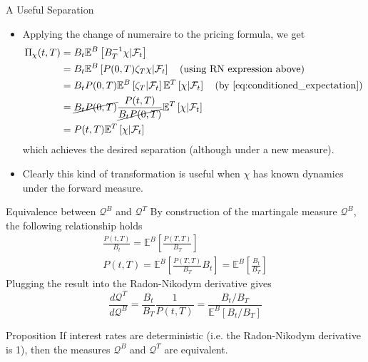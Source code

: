 \documentclass{beamer}
\begin{document}
\begin{frame}{A Useful Separation}
  \begin{itemize}
  \item<1-> Applying the change of numeraire to the pricing formula, we get
    \begin{equation*}
      \begin{aligned}
	\Pi_\chi(t,T) & = B_t\mathbb{E}^B\left[B^{-1}_T\chi|\mathcal{F}_t\right] \\
	& = B_t\mathbb{E}^B\left[P(0,T)\zeta_T\chi|\mathcal{F}_t\right]\quad\text{(using RN expression above)}\\
	& = B_tP(0,T)\mathbb{E}^B\left[\zeta_T|\mathcal{F}_t\right]\mathbb{E}^T\left[\chi|\mathcal{F}_t\right]\quad\text{(by \cref{eq:conditioned_expectation})}\\
	& = \cancel{B_tP(0,T)}\frac{P(t,T)}{\cancel{B_tP(0,T)}}\mathbb{E}^T\left[\chi|\mathcal{F}_t\right] \\
	& = P(t,T)\mathbb{E}^T\left[\chi|\mathcal{F}_t\right] \\
      \end{aligned}
    \end{equation*}
    which achieves the desired separation (although under a new measure).
  \item<2-> Clearly this kind of transformation is useful when $\chi$ has known dynamics under the forward measure.
  \end{itemize}
\end{frame}

\begin{frame}{Equivalence between $\mathcal{Q}^B$ and $\mathcal{Q}^T$}
  By construction of the martingale measure $\mathcal{Q}^B$, the following relationship holds
  \begin{equation*}
    \begin{gathered}
      \frac{P(t,T)}{B_t}=\mathbb{E}^B\left[\frac{P(T,T)}{B_T}\right]\\[0.3cm]
      P(t,T)=\mathbb{E}^B\left[\frac{P(T,T)}{B_T}B_t\right] = \mathbb{E}^B\left[\frac{B_t}{B_T}\right]
    \end{gathered}
  \end{equation*}
	\pause
  Plugging the result into the Radon-Nikodym derivative gives
  \begin{equation*}
    \frac{d\mathcal{Q}^T}{d\mathcal{Q}^B} = \frac{B_t}{B_T}\frac{1}{P(t,T)} =\frac{B_t/B_T}{\mathbb{E}^B[B_t/B_T]}
  \end{equation*}
	\pause
  \begin{block}{Proposition}
    If interest rates are deterministic (i.e. the Radon-Nikodym derivative is 1), then the measures $\mathcal{Q}^B$ and $\mathcal{Q}^T$ are equivalent.
  \end{block}
\end{frame}
\end{document}
